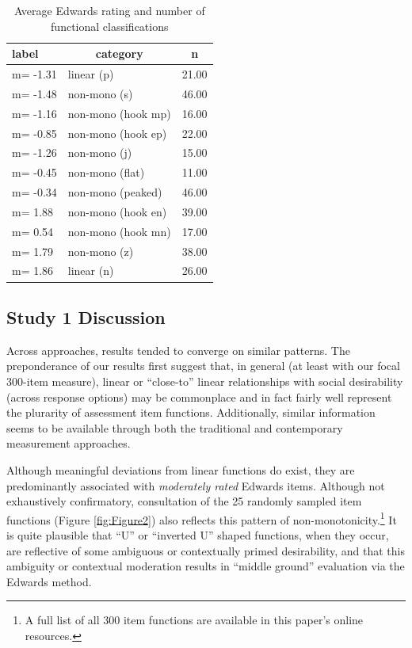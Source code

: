 \documentclass[
  ,jou]{apa6}
\begin{document}
\begin{table}[tbp]

\begin{center}
\begin{threeparttable}

\caption{\label{tab:qsorttable}Average Edwards rating and number of functional classifications}

\begin{tabular}{lll}
\toprule
label & \multicolumn{1}{c}{category} & \multicolumn{1}{c}{n}\\
\midrule
m= -1.31 & linear (p) & 21.00\\
m= -1.48 & non-mono (s) & 46.00\\
m= -1.16 & non-mono (hook mp) & 16.00\\
m= -0.85 & non-mono (hook ep) & 22.00\\
m= -1.26 & non-mono (j) & 15.00\\
m= -0.45 & non-mono (flat) & 11.00\\
m= -0.34 & non-mono (peaked) & 46.00\\
m= 1.88 & non-mono (hook en) & 39.00\\
m= 0.54 & non-mono (hook mn) & 17.00\\
m= 1.79 & non-mono (z) & 38.00\\
m= 1.86 & linear (n) & 26.00\\
\bottomrule
\end{tabular}

\end{threeparttable}
\end{center}

\end{table}

\subsection{Study 1 Discussion}\label{study-1-discussion}

Across approaches, results tended to converge on similar patterns. The preponderance of our results first suggest that, in general (at least with our focal 300-item measure), linear or ``close-to'' linear relationships with social desirability (across response options) may be commonplace and in fact fairly well represent the plurarity of assessment item functions. Additionally, similar information seems to be available through both the traditional and contemporary measurement approaches.

Although meaningful deviations from linear functions do exist, they are predominantly associated with \emph{moderately rated} Edwards items. Although not exhaustively confirmatory, consultation of the 25 randomly sampled item functions (Figure \ref{fig:Figure2}) also reflects this pattern of non-monotonicity.\footnote{A full list of all 300 item functions are available in this paper's online resources.} It is quite plausible that ``U'' or ``inverted U'' shaped functions, when they occur, are reflective of some ambiguous or contextually primed desirability, and that this ambiguity or contextual moderation results in ``middle ground'' evaluation via the Edwards method.
\end{document}

